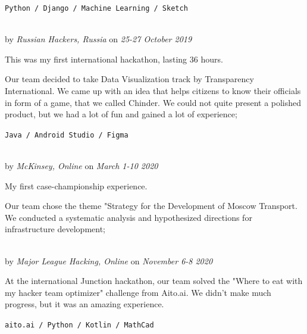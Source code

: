 \texttt{Python / Django / Machine Learning / Sketch}

\SmallSep

 \\
by \textit{Russian Hackers, Russia}
on \textit{25-27 October 2019}
\SmallSep

This was my first international hackathon, lasting 36 hours.

Our team decided to take Data Visualization track by Transparency International. We came up with an idea that helps citizens to know their officials in form of a game, that we called Chinder. 
We could not quite present a polished product, but we had a lot of fun and gained a lot of experience;

\texttt{Java / Android Studio / Figma}

\SmallSep

 \\
by \textit{McKinsey, Online}
on \textit{March 1-10 2020}
\SmallSep

My first case-championship experience.

Our team chose the theme "Strategy for the Development of Moscow Transport. We conducted a systematic analysis and hypothesized directions for infrastructure development;

\SmallSep



 \\
by \textit{Major League Hacking, Online}
on \textit{November 6-8 2020}
\SmallSep

At the international Junction hackathon, our team solved the "Where to eat with my hacker team optimizer" challenge from Aito.ai. We didn't make much progress, but it was an amazing experience.

\texttt{aito.ai / Python / Kotlin / MathCad}

\SmallSep

\Sep
